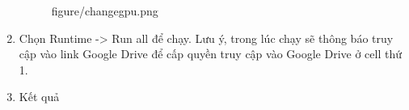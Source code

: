 \begin{enumerate}
\begin{figure}[!h]
{        {figure/changegpu.png}}
    \end{figure}
    \begin{figure}[h]
    \end{figure}
    \clearpage
    \item Chọn Runtime -> Run all để chạy. Lưu ý, trong lúc chạy sẽ thông báo truy cập vào link Google Drive để cấp quyền truy cập vào Google Drive ở cell thứ 1. 
    \begin{figure}[h]
    \end{figure}
    \begin{figure}[h]
    \end{figure}
    \item Kết quả
    \begin{figure}[h]
    \end{figure}
\end{enumerate}
